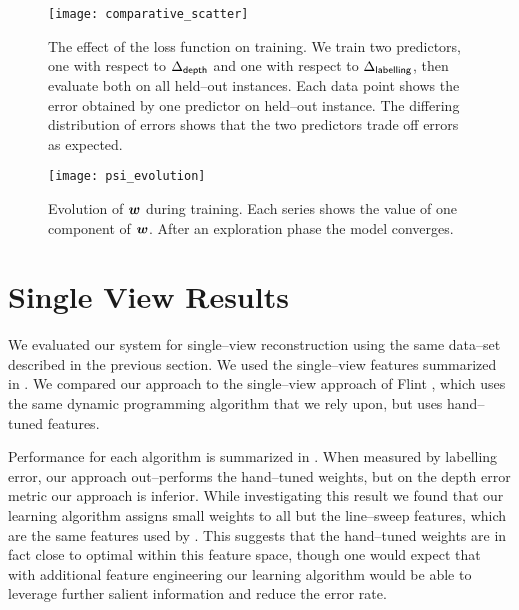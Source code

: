 \begin{figure}[tb]%
  \centering
  \texttt{[image: comparative\_scatter]}
  \caption{The effect of the loss function on training. We train two
    predictors, one with respect to $\DepthLoss$ and one with respect
    to $\LblLoss$, then evaluate both on all held--out instances. Each
    data point shows the error obtained by one predictor on held--out
    instance. The differing distribution of errors shows that the two
    predictors trade off errors as expected.}
  \label{fig:comparative-scatter}
\end{figure}

\begin{figure}[tb]
  \centering
  \texttt{[image: psi\_evolution]}
  \caption{Evolution of $\Model$ during training. Each series shows
    the value of one component of $\Model$. After an
    exploration phase the model converges.}
  \label{fig:psi-evolution}
\end{figure}

\section{Single View Results}
\label{sec:sv-results}

We evaluated our system for single--view reconstruction using the same
data--set described in the previous section. We used the single--view
features summarized in . We compared our approach
to the single--view approach of Flint \etal \cite{Flint10eccv}, which
uses the same dynamic programming algorithm that we rely upon, but
uses hand--tuned features.

Performance for each algorithm is summarized in
. When measured by labelling error, our
approach out--performs the hand--tuned weights, but on the depth error
metric our approach is inferior. While investigating this result we
found that our learning algorithm assigns small weights to all but the
line--sweep features, which are the same features used by
\cite{Flint10eccv}. This suggests that the hand--tuned weights are in
fact close to optimal within this feature space, though one would
expect that with additional feature engineering our learning algorithm
would be able to leverage further salient information and reduce the
error rate.



